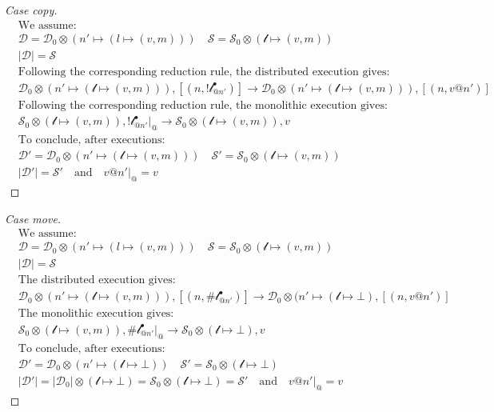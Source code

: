 \begin{proof}[Case copy]
    \begin{align*}
    &\text{We assume:}\\
    &\mathcal{D} = \mathcal{D}_0 \otimes (n' \mapsto (l\mapsto (v, m)))\quad
    \mathcal{S} = \mathcal{S}_0 \otimes (\mathscr{l} \mapsto (v, m))\\
    &|\mathcal{D}| = \mathcal{S}\\
    &\text{Following the corresponding reduction rule, the distributed execution gives:}\\
    &\mathcal{D}_0 \otimes (n' \mapsto (\mathscr{l} \mapsto (v,m))) , [(n, !\mathscr{l}^\bullet_{@n'})] \longrightarrow \mathcal{D}_0 \otimes (n' \mapsto (\mathscr{l} \mapsto (v, m))), [(n, v@n')]\\
    &\text{Following the corresponding reduction rule, the monolithic execution gives:}\\
    &\mathcal{S}_0 \otimes (\mathscr{l} \mapsto (v, m)), !\mathscr{l}^\bullet_{@n'}|_@ \longrightarrow \mathcal{S}_0 \otimes (\mathscr{l} \mapsto (v, m)), v\\
    &\text{To conclude, after executions:}\\
    &\mathcal{D}' = \mathcal{D}_0 \otimes (n' \mapsto (\mathscr{l} \mapsto (v, m))) \quad 
    \mathcal{S}' = \mathcal{S}_0 \otimes (\mathscr{l} \mapsto (v, m))\\
    &|\mathcal{D}'| = \mathcal{S}' \quad \text{and} \quad v@n'|_@ = v
    \end{align*}
\end{proof}
\begin{proof}[Case move]
    \begin{align*}
    &\text{We assume:}\\
    &\mathcal{D} = \mathcal{D}_0 \otimes (n' \mapsto (l\mapsto (v, m)))\quad
    \mathcal{S} = \mathcal{S}_0 \otimes (\mathscr{l} \mapsto (v, m))\\
    &|\mathcal{D}| = \mathcal{S}\\
    &\text{The distributed execution gives:}\\
    &\mathcal{D}_0 \otimes (n' \mapsto (\mathscr{l} \mapsto (v,m))) , [(n, \#\mathscr{l}^\bullet_{@n'})] \longrightarrow \mathcal{D}_0 \otimes (n' \mapsto (\mathscr{l} \mapsto \bot), [(n, v@n')]\\
    &\text{The monolithic execution gives:}\\
    &\mathcal{S}_0 \otimes (\mathscr{l} \mapsto (v, m)), \#\mathscr{l}^\bullet_{@n'}|_@ \longrightarrow \mathcal{S}_0 \otimes (\mathscr{l} \mapsto \bot), v\\
    &\text{To conclude, after executions:}\\
    &\mathcal{D}' = \mathcal{D}_0 \otimes (n' \mapsto (\mathscr{l} \mapsto \bot)) \quad 
    \mathcal{S}' = \mathcal{S}_0 \otimes (\mathscr{l} \mapsto \bot)\\
    &|\mathcal{D}'| = |\mathcal{D}_0| \otimes (\mathscr{l} \mapsto \bot) = \mathcal{S}_0 \otimes (\mathscr{l} \mapsto \bot) = \mathcal{S}' \quad \text{and} \quad v@n'|_@ = v
    \end{align*}
\end{proof}
